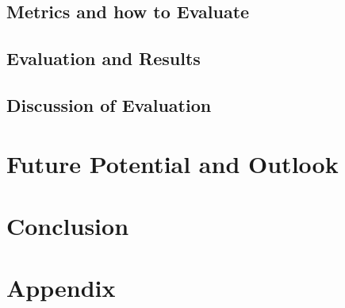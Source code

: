\documentclass[12pt, a4paper]{article}
\begin{document}
    \subsection{Metrics and how to Evaluate}
    \subsection{Evaluation and Results}
    \subsection{Discussion of Evaluation}

\section{Future Potential and Outlook}\label{sec::outlook}
\section{Conclusion}\label{sec::conclusion}



\newpage
\renewcommand{\thesubsection}{\Alph{subsection}}
\setcounter{page}{\value{lastroman}}
\section*{Appendix}


\newpage



\newpage
\listoffigures
\listoftables
\lstlistoflistings{}

% 




\end{document}
